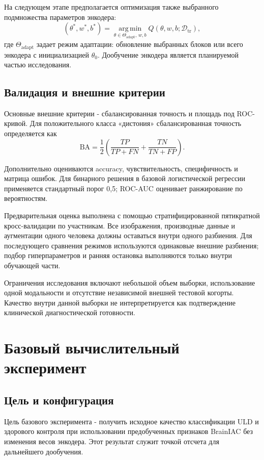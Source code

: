 \documentclass[11pt,a4paper]{article}
\begin{document}
На следующем этапе предполагается оптимизация также выбранного подмножества параметров энкодера:
\[
(\theta^*,w^*,b^*)=
\operatorname*{arg\,min}_{\theta\in\Theta_{\mathrm{adapt}},\,w,b}
Q(\theta,w,b;\mathcal{D}_{\mathrm{tr}}),
\]
где \(\Theta_{\mathrm{adapt}}\) задает режим адаптации: обновление выбранных блоков или всего энкодера с инициализацией \(\theta_0\). Дообучение энкодера является планируемой частью исследования.

\subsection{Валидация и внешние критерии}

Основные внешние критерии - сбалансированная точность и площадь под ROC-кривой. Для положительного класса «дистония» сбалансированная точность определяется как
\[
\mathrm{BA}=
\frac{1}{2}
\left(
\frac{TP}{TP+FN}
+
\frac{TN}{TN+FP}
\right).
\]

Дополнительно оцениваются accuracy, чувствительность, специфичность и матрица ошибок. Для бинарного решения в базовой логистической регрессии применяется стандартный порог 0,5; ROC-AUC оценивает ранжирование по вероятностям.

Предварительная оценка выполнена с помощью стратифицированной пятикратной кросс-валидации по участникам. Все изображения, производные данные и аугментации одного человека должны оставаться внутри одного разбиения. Для последующего сравнения режимов используются одинаковые внешние разбиения; подбор гиперпараметров и ранняя остановка выполняются только внутри обучающей части.

Ограничения исследования включают небольшой объем выборки, использование одной модальности и отсутствие независимой внешней тестовой когорты. Качество внутри данной выборки не интерпретируется как подтверждение клинической диагностической готовности.

\section{Базовый вычислительный эксперимент}

\subsection{Цель и конфигурация}

Цель базового эксперимента - получить исходное качество классификации ULD и здорового контроля при использовании предобученных признаков BrainIAC без изменения весов энкодера. Этот результат служит точкой отсчета для дальнейшего дообучения.
\end{document}
